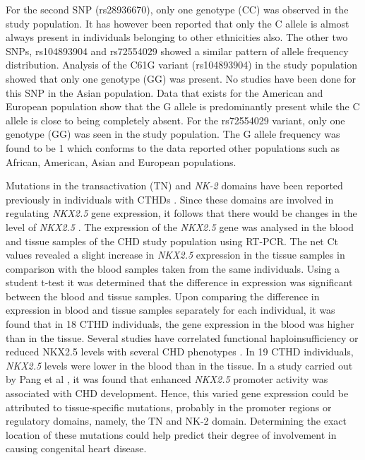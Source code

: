 \begin{refsection}
For the second SNP (rs28936670), only one genotype (CC) was observed in the study population. It has however been reported that only the C allele is almost always present in individuals belonging to other ethnicities also. The other two SNPs, rs104893904 and rs72554029 showed a similar pattern of allele frequency distribution. Analysis of the C61G variant (rs104893904) in the study population showed that only one genotype (GG) was present. No studies have been done for this SNP in the Asian population. Data that exists for the American and European population show that the G allele is predominantly present while the C allele is close to being completely absent. For the rs72554029 variant, only one genotype (GG) was seen in the study population. The G allele frequency was found to be 1 which conforms to the data reported other populations such as African, American, Asian and European populations.

Mutations in the transactivation (TN) and \textit{NK-2} domains have been reported previously in individuals with CTHDs \cite{mcelhinney2003nkx2}. Since these domains are involved in regulating \textit{NKX2.5} gene expression, it follows that there would be changes in the level of \textit{NKX2.5} \cite{inga2005functional}. The expression of the \textit{NKX2.5} gene was analysed in the blood and tissue samples of the CHD study population using RT-PCR. The net Ct values revealed a slight increase in \textit{NKX2.5} expression in the tissue samples in comparison with the blood samples taken from the same individuals. Using a student t-test it was determined that the difference in expression was significant between the blood and tissue samples. Upon comparing the difference in expression in blood and tissue samples separately for each individual, it was found that in 18 CTHD individuals, the gene expression in the blood was higher than in the tissue. Several studies have correlated functional haploinsufficiency or reduced NKX2.5 levels with several CHD phenotypes \cite{sarkozy2005spectrum,briggs2008perinatal}. In 19 CTHD individuals, \textit{NKX2.5} levels were lower in the blood than in the tissue. In a study carried out by Pang et al \cite{pang2012genetic}, it was found that enhanced \textit{NKX2.5} promoter activity was associated with CHD development. Hence, this varied gene expression could be attributed to tissue-specific mutations, probably in the promoter regions or regulatory domains, namely, the TN and NK-2 domain. Determining the exact location of these mutations could help predict their degree of involvement in causing congenital heart disease.


\end{refsection}
